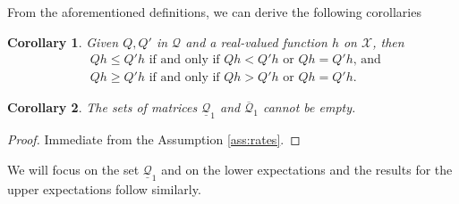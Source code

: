 \documentclass{article}
\newcommand{\statessymbol}{\mathcal{X}}
\newcommand{\matrices}{\mathcal{Q}}
\newcommand{\lmatrixi}[1]{\underline{\matrices}_{#1}}
\newcommand{\umatrixi}[1]{\overline{\matrices}_{#1}}
\newcommand{\stateset}{\statessymbol}
\newtheorem{Corollary}{Corollary}
\begin{document}
\noindent
From the  aforementioned definitions, we can derive the following corollaries
\begin{Corollary} \label{cor:comparison}
Given  $ Q, Q'$ in $\matrices$ and a real-valued function $h$ on $\stateset$, then  
\begin{equation*}
\begin{split}
& Q h\leq  Q'h \text{ if and only if }  Q h <  Q'h \text{ or }  Q h =  Q'h
\text{, and }\\
& Q h\geq  Q'h \text{ if and only if }  Q h >  Q'h \text{ or }  Q h =  Q'h.
\end{split}
\end{equation*}
\end{Corollary}
\begin{Corollary} \label{cor:empty}
The sets of matrices $\lmatrixi{1}$ and $\umatrixi{1}$ cannot be empty.
\end{Corollary}
\begin{proof}
Immediate from the Assumption \ref{ass:rates}.
\end{proof}

\noindent
We will focus on the set $\lmatrixi{1}$ and on the lower expectations and the results for the upper expectations follow similarly.
\end{document}

